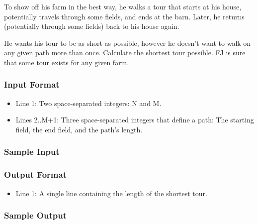 To show off his farm in the best way, he walks a tour that starts at his house, potentially travels through some fields, and ends at the barn. 
Later, he returns (potentially through some fields) back to his house again. 

He wants his tour to be as short as possible, however he doesn't want to walk on any given path more than once. 
Calculate the shortest tour possible. 
FJ is sure that some tour exists for any given farm.

\subsubsection{Input Format}
\begin{itemize}
	\item Line 1: Two space-separated integers: N and M. 
	\item Lines 2..M+1: Three space-separated integers that define a path: The starting field, the end field, and the path's length. 
\end{itemize}

\subsubsection{Sample Input}

\subsubsection{Output Format}
\begin{itemize}
	\item Line 1: A single line containing the length of the shortest tour. 
\end{itemize}

\subsubsection{Sample Output}













